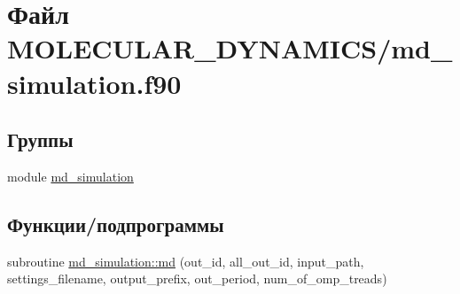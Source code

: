 \hypertarget{md__simulation_8f90}{}\section{Файл M\+O\+L\+E\+C\+U\+L\+A\+R\+\_\+\+D\+Y\+N\+A\+M\+I\+C\+S/md\+\_\+simulation.f90}
\label{md__simulation_8f90}
\subsection*{Группы}
\begin{DoxyCompactItemize}
\item 
module \mbox{\hyperlink{namespacemd__simulation}{md\+\_\+simulation}}
\end{DoxyCompactItemize}
\subsection*{Функции/подпрограммы}
\begin{DoxyCompactItemize}
\item 
subroutine \mbox{\hyperlink{namespacemd__simulation_ab2107f3ca598f6a748991632633ee760}{md\+\_\+simulation\+::md}} (out\+\_\+id, all\+\_\+out\+\_\+id, input\+\_\+path, settings\+\_\+filename, output\+\_\+prefix, out\+\_\+period, num\+\_\+of\+\_\+omp\+\_\+treads)
\end{DoxyCompactItemize}
